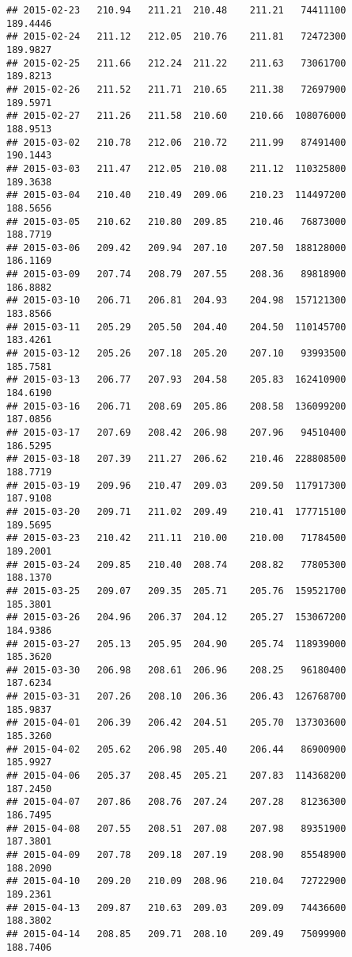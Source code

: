 \documentclass[
]{article}
\begin{document}
\begin{verbatim}
## 2015-02-23   210.94   211.21  210.48    211.21   74411100     189.4446
## 2015-02-24   211.12   212.05  210.76    211.81   72472300     189.9827
## 2015-02-25   211.66   212.24  211.22    211.63   73061700     189.8213
## 2015-02-26   211.52   211.71  210.65    211.38   72697900     189.5971
## 2015-02-27   211.26   211.58  210.60    210.66  108076000     188.9513
## 2015-03-02   210.78   212.06  210.72    211.99   87491400     190.1443
## 2015-03-03   211.47   212.05  210.08    211.12  110325800     189.3638
## 2015-03-04   210.40   210.49  209.06    210.23  114497200     188.5656
## 2015-03-05   210.62   210.80  209.85    210.46   76873000     188.7719
## 2015-03-06   209.42   209.94  207.10    207.50  188128000     186.1169
## 2015-03-09   207.74   208.79  207.55    208.36   89818900     186.8882
## 2015-03-10   206.71   206.81  204.93    204.98  157121300     183.8566
## 2015-03-11   205.29   205.50  204.40    204.50  110145700     183.4261
## 2015-03-12   205.26   207.18  205.20    207.10   93993500     185.7581
## 2015-03-13   206.77   207.93  204.58    205.83  162410900     184.6190
## 2015-03-16   206.71   208.69  205.86    208.58  136099200     187.0856
## 2015-03-17   207.69   208.42  206.98    207.96   94510400     186.5295
## 2015-03-18   207.39   211.27  206.62    210.46  228808500     188.7719
## 2015-03-19   209.96   210.47  209.03    209.50  117917300     187.9108
## 2015-03-20   209.71   211.02  209.49    210.41  177715100     189.5695
## 2015-03-23   210.42   211.11  210.00    210.00   71784500     189.2001
## 2015-03-24   209.85   210.40  208.74    208.82   77805300     188.1370
## 2015-03-25   209.07   209.35  205.71    205.76  159521700     185.3801
## 2015-03-26   204.96   206.37  204.12    205.27  153067200     184.9386
## 2015-03-27   205.13   205.95  204.90    205.74  118939000     185.3620
## 2015-03-30   206.98   208.61  206.96    208.25   96180400     187.6234
## 2015-03-31   207.26   208.10  206.36    206.43  126768700     185.9837
## 2015-04-01   206.39   206.42  204.51    205.70  137303600     185.3260
## 2015-04-02   205.62   206.98  205.40    206.44   86900900     185.9927
## 2015-04-06   205.37   208.45  205.21    207.83  114368200     187.2450
## 2015-04-07   207.86   208.76  207.24    207.28   81236300     186.7495
## 2015-04-08   207.55   208.51  207.08    207.98   89351900     187.3801
## 2015-04-09   207.78   209.18  207.19    208.90   85548900     188.2090
## 2015-04-10   209.20   210.09  208.96    210.04   72722900     189.2361
## 2015-04-13   209.87   210.63  209.03    209.09   74436600     188.3802
## 2015-04-14   208.85   209.71  208.10    209.49   75099900     188.7406

\end{verbatim}
\end{document}
